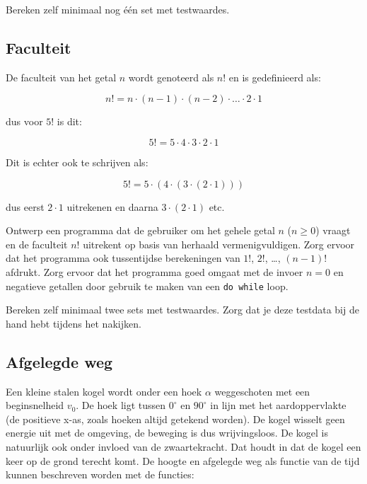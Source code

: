 \documentclass[a4paper,10pt,fleqn,twoside]{article}
\begin{document}

Bereken zelf minimaal nog één set met testwaardes.

\subsection{Faculteit}
De faculteit van het getal $n$ wordt genoteerd als $n!$ en is gedefinieerd als:

\begin{equation*}
n! = n\cdot (n-1)\cdot (n-2)\cdot\ldots\cdot2\cdot1
\end{equation*}

dus voor $5!$ is dit:

\begin{equation*}
5! = 5\cdot4\cdot3\cdot2\cdot1
\end{equation*}

Dit is echter ook te schrijven als:

\begin{equation*}
5! = 5\cdot(4\cdot(3\cdot(2\cdot1)))
\end{equation*}

dus eerst $2\cdot1$ uitrekenen en daarna $3\cdot(2\cdot1)$ etc.

Ontwerp een programma dat de gebruiker om het gehele getal $n$ ($n \geq 0$) vraagt en de faculteit $n!$ uitrekent op basis van herhaald vermenigvuldigen. Zorg ervoor dat het programma ook tussentijdse berekeningen van $1!$, $2!$, \ldots, $(n-1)!$ afdrukt. Zorg ervoor dat het programma goed omgaat met de invoer $n = 0$ en negatieve getallen door gebruik te maken van een \lstinline|do while| loop.

Bereken zelf minimaal twee sets met testwaardes. Zorg dat je deze testdata bij de hand hebt tijdens het nakijken.

\subsection{Afgelegde weg}
Een kleine stalen kogel wordt onder een hoek $\alpha$ weggeschoten met een beginsnelheid $v_0$. De hoek ligt tussen $0^\circ$ en $90^\circ$ in lijn met het aardoppervlakte (de positieve x-as, zoals hoeken altijd getekend worden). De kogel wisselt geen energie uit met de omgeving, de beweging is dus wrijvingsloos. De kogel is natuurlijk ook onder invloed van de zwaartekracht. Dat houdt in dat de kogel een keer op de grond terecht komt. De hoogte en afgelegde weg als functie van de tijd kunnen beschreven worden met de functies:
\end{document}
